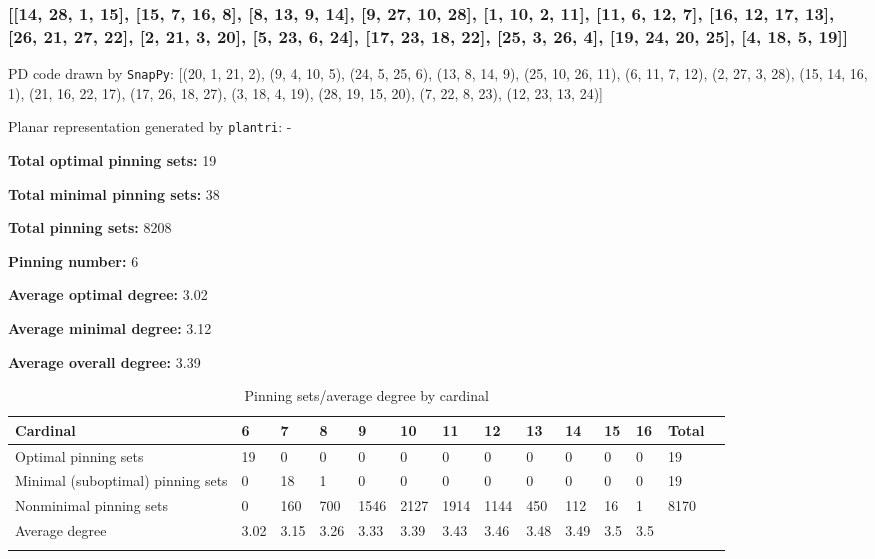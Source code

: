 \documentclass{article}%
\begin{document}
\newpage

\subsubsection{[[14, 28, 1, 15], [15, 7, 16, 8], [8, 13, 9, 14], [9, 27, 10, 28], [1, 10, 2, 11], [11, 6, 12, 7], [16, 12, 17, 13], [26, 21, 27, 22], [2, 21, 3, 20], [5, 23, 6, 24], [17, 23, 18, 22], [25, 3, 26, 4], [19, 24, 20, 25], [4, 18, 5, 19]]}

{\small\noindent PD code drawn by \texttt{SnapPy}: [(20, 1, 21, 2), (9, 4, 10, 5), (24, 5, 25, 6), (13, 8, 14, 9), (25, 10, 26, 11), (6, 11, 7, 12), (2, 27, 3, 28), (15, 14, 16, 1), (21, 16, 22, 17), (17, 26, 18, 27), (3, 18, 4, 19), (28, 19, 15, 20), (7, 22, 8, 23), (12, 23, 13, 24)]}

{\small\noindent Planar representation generated by \texttt{plantri}: -}

\begin{multicols}{2}
{\normalsize \noindent\textbf{Total optimal pinning sets:} 19

\noindent\textbf{Total minimal pinning sets:} 38

\noindent\textbf{Total pinning sets:} 8208

\noindent\textbf{Pinning number:} 6

}
\columnbreak

{\normalsize \noindent\textbf{Average optimal degree:} 3.02

\noindent\textbf{Average minimal degree:} 3.12

\noindent\textbf{Average overall degree:} 3.39

}
\end{multicols}

\begin{table}[ht]
	\caption{Pinning sets/average degree by cardinal}
	\centering
	\renewcommand{\arraystretch}{1.5}
	\begin{tabularx}{\textwidth}{lXXXXXXXXXXXXX}
		\toprule
			Cardinal & 6 & 7 & 8 & 9 & 10 & 11 & 12 & 13 & 14 & 15 & 16 & Total\\
			\hline
			Optimal pinning sets & 19 & 0 & 0 & 0 & 0 & 0 & 0 & 0 & 0 & 0 & 0 & 19 \\
			Minimal (suboptimal) pinning sets & 0 & 18 & 1 & 0 & 0 & 0 & 0 & 0 & 0 & 0 & 0 & 19 \\
			Nonminimal pinning sets & 0 & 160 & 700 & 1546 & 2127 & 1914 & 1144 & 450 & 112 & 16 & 1 & 8170 \\
			Average degree & 3.02 & 3.15 & 3.26 & 3.33 & 3.39 & 3.43 & 3.46 & 3.48 & 3.49 & 3.5 & 3.5 &  \\
		\bottomrule \\ 
	\end{tabularx}
\end{table}
\end{document}
